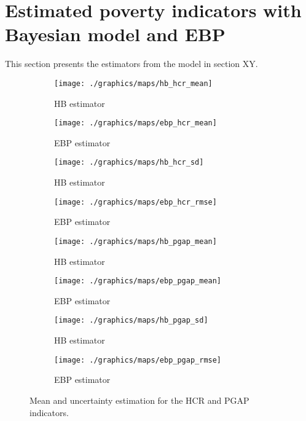 \section{Estimated poverty indicators with Bayesian model and EBP}
This section presents the estimators from the model in section XY.

\begin{figure}
    \begin{subfigure}{0.49\linewidth}
        \centering
        \texttt{[image: ./graphics/maps/hb\_hcr\_mean]}
        \caption{HB estimator}
    \end{subfigure}
    \begin{subfigure}{0.49\linewidth}
        \centering
        \texttt{[image: ./graphics/maps/ebp\_hcr\_mean]}
        \caption{EBP estimator}
    \end{subfigure}

    \begin{subfigure}{0.49\linewidth}
        \centering
        \texttt{[image: ./graphics/maps/hb\_hcr\_sd]}
        \caption{HB estimator}
    \end{subfigure}
    \begin{subfigure}{0.49\linewidth}
        \centering
        \texttt{[image: ./graphics/maps/ebp\_hcr\_rmse]}
        \caption{EBP estimator}
    \end{subfigure}

    \begin{subfigure}{0.49\linewidth}
        \centering
        \texttt{[image: ./graphics/maps/hb\_pgap\_mean]}
        \caption{HB estimator}
    \end{subfigure}
    \begin{subfigure}{0.49\linewidth}
        \centering
        \texttt{[image: ./graphics/maps/ebp\_pgap\_mean]}
        \caption{EBP estimator}
    \end{subfigure}

    \begin{subfigure}{0.49\linewidth}
        \centering
        \texttt{[image: ./graphics/maps/hb\_pgap\_sd]}
        \caption{HB estimator}
    \end{subfigure}
    \begin{subfigure}{0.49\linewidth}
        \centering
        \texttt{[image: ./graphics/maps/ebp\_pgap\_rmse]}
        \caption{EBP estimator}
    \end{subfigure}
    \caption{Mean and uncertainty estimation for the HCR and PGAP indicators.}
\end{figure}